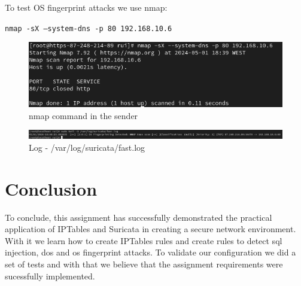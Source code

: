 \documentclass{article}
\begin{document}
To test OS fingerprint attacks we use nmap:\par

\texttt{nmap -sX --system-dns -p 80 192.168.10.6}
\texttt{}\par
\begin{figure}[H]
    \centering
    \includegraphics[scale=0.5]{suricata/os_fingertip_nmap_external.png}
    \caption{nmap command in the sender}
    \label{fig:network-arc}
\end{figure}


\texttt{}\par
\begin{figure}[H]
    \centering
    \includegraphics[scale=0.45]{suricata/os_fingertip_nmap_log.png}
    \caption{Log - /var/log/suricata/fast.log}
    \label{fig:network-arc}
\end{figure}



\section{Conclusion}
\quad To conclude, this assignment has successfully demonstrated the practical application of IPTables and Suricata in creating a secure network environment. With it we learn how to create IPTables rules and create rules to detect sql injection, dos and os fingerprint attacks. To validate our configuration we did a set of tests and with that we believe that the assignment requirements were sucessfully implemented.
\end{document}

